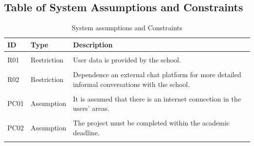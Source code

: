\documentclass[12pt,a4paper]{report}
\begin{document}
\subsection{Table of System Assumptions and Constraints}
\begin{table}[H]
\centering
\caption{System assumptions  and Constraints}
\begin{tabularx}{\textwidth}{@{} l l X @{}}
\toprule
\textbf{ID} & \textbf{Type} & \textbf{Description} \\
\midrule


\\
R01 & Restriction & User data is provided by the school. 
\\
\\
R02 & Restriction & Dependence an external chat platform for more detailed informal conversations with the school.
\\
\\
PC01 & Assumption & It is assumed that there is an internet connection in the users' areas. 
\\
\\
PC02 & Assumption & The project must be completed within the academic deadline.  
\\
\\
\bottomrule
\end{tabularx}
\end{table}
\end{document}

